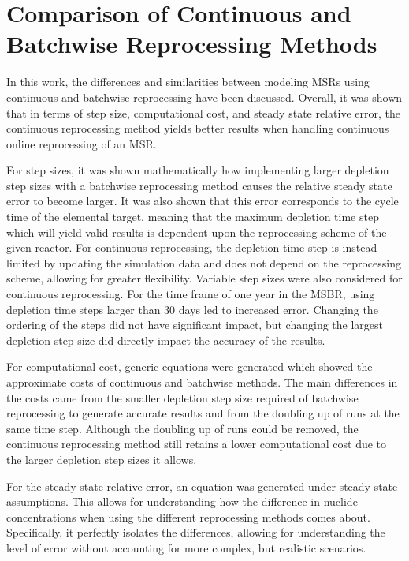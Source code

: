 \renewcommand*\descriptionlabel[1]{\hspace\leftmargin$#1$}
\setcounter{tocdepth}{5}
\setcounter{secnumdepth}{5}

\section{Comparison of Continuous and Batchwise Reprocessing Methods}

In this work, the differences and similarities between modeling MSRs using continuous and batchwise reprocessing have been discussed. Overall, it was shown that in terms of step size, computational cost, and steady state relative error, the continuous reprocessing method yields better results when handling continuous online reprocessing of an MSR.

For step sizes, it was shown mathematically how implementing larger depletion step sizes with a batchwise reprocessing method causes the relative steady state error to become larger.
It was also shown that this error corresponds to the cycle time of the elemental target, meaning that the maximum depletion time step which will yield valid results is dependent upon the reprocessing scheme of the given reactor.
For continuous reprocessing, the depletion time step is instead limited by updating the simulation data and does not depend on the reprocessing scheme, allowing for greater flexibility.
Variable step sizes were also considered for continuous reprocessing.
For the time frame of one year in the MSBR, using depletion time steps larger than 30 days led to increased error.
Changing the ordering of the steps did not have significant impact, but changing the largest depletion step size did directly impact the accuracy of the results.

For computational cost, generic equations were generated which showed the approximate costs of continuous and batchwise methods. The main differences in the costs came from the smaller depletion step size required of batchwise reprocessing to generate accurate results and from the doubling up of runs at the same time step.
Although the doubling up of runs could be removed, the continuous reprocessing method still retains a lower computational cost due to the larger depletion step sizes it allows.

For the steady state relative error, an equation was generated under steady state assumptions.
This allows for understanding how the difference in nuclide concentrations when using the different reprocessing methods comes about.
Specifically, it perfectly isolates the differences, allowing for understanding the level of error without accounting for more complex, but realistic scenarios.

